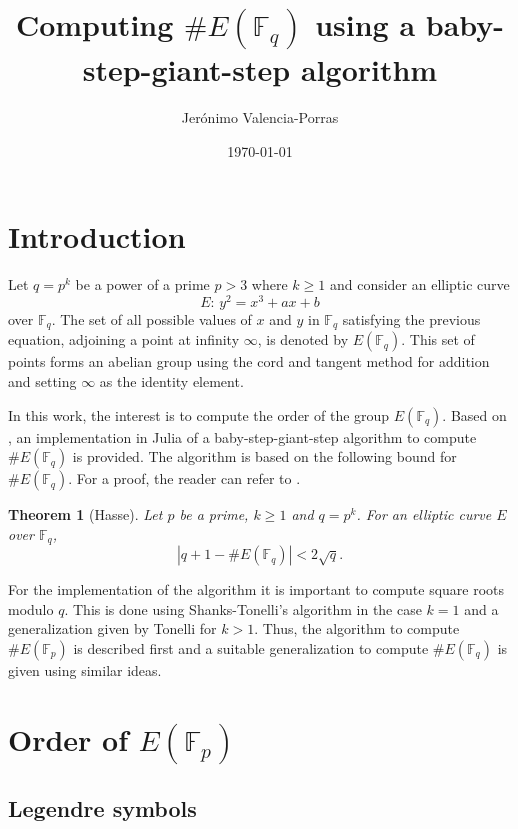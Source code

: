 \documentclass[letter,11pt,reqno]{article}
\title{Computing $\#E(\mathbb{F}_q)$ using a baby-step-giant-step algorithm}
\date{\today}
\author{Jerónimo Valencia-Porras}
\newtheorem{theorem}{Theorem}[section]
\theoremstyle{definition}
\theoremstyle{definition}
\theoremstyle{definition}
\theoremstyle{remark}
\theoremstyle{definition}
\theoremstyle{definition}
\newcommand{\Fp}{\mathbb{F}_p}
\newcommand{\Fq}{\mathbb{F}_q}
\begin{document}
\maketitle
\vspace{-0.5cm}

\section{Introduction}
Let $q=p^k$ be a power of a prime $p > 3$ where $k\geq 1$ and consider an elliptic curve 
\begin{equation}\label{eq:curve}
    E:\, y^2 = x^3+ax+b
\end{equation}
over $\Fq$. The set of all possible values of $x$ and $y$ in $\Fq$ satisfying the previous equation, adjoining a point at infinity $\infty$, is denoted by $E(\Fq)$. This set of points forms an abelian group using the cord and tangent method for addition and setting $\infty$ as the identity element. 

\noindent In this work, the interest is to compute the order of the group $E(\Fq)$. Based on \cite{Schoof1995}, an implementation in Julia of a baby-step-giant-step algorithm to compute $\# E(\mathbb{F}_q)$ is provided. The algorithm is based on the following bound for $\# E(\Fq)$. For a proof, the reader can refer to \cite{silverman2009arithmetic}.

\begin{theorem} [Hasse]\label{thm:Hasse}
Let $p$ be a prime, $k\geq 1$ and $q=p^k$. For an elliptic curve $E$ over $\Fq$, $$\left | q+1 - \#E(\Fq) \right | < 2\sqrt{q}.$$
\end{theorem}

\noindent For the implementation of the algorithm it is important to compute square roots modulo $q$. This is done using Shanks-Tonelli's algorithm \cite{ezrabrown,1973-shanks} in the case $k=1$ and a generalization given by Tonelli \cite{tonelli1891} for $k>1$. Thus, the algorithm to compute $\# E(\Fp)$ is described first and a suitable generalization to compute $\# E(\Fq)$ is given using similar ideas.

\section{Order of $E(\Fp)$}

\subsection{Legendre symbols}
\end{document}
